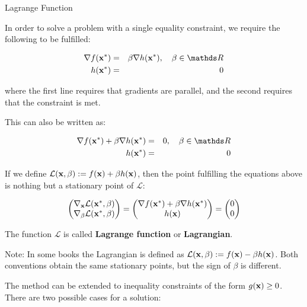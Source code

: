 \documentclass[11pt,compress,t,notes=noshow, xcolor=table]{beamer}
\begin{document}
\begin{vbframe}{Lagrange Function}

In order to solve a problem with a single equality constraint, we require the following to be fulfilled: 

\begin{eqnarray*}
\nabla f(\xv^\ast) &=& \beta \nabla h(\xv^\ast), \quad \beta \in \R\\
h(\xv^\ast) &=& 0
\end{eqnarray*}

where the first line requires that gradients are parallel, and the second requires that the constraint is met. 

\lz 

This can also be written as: 

\begin{eqnarray*}
\nabla f(\xv^\ast) + \beta \nabla h(\xv^\ast) &=& 0, \quad \beta \in \R\\
h(\xv^\ast) &=& 0
\end{eqnarray*}

\framebreak 

If we define $\mathcal{L}(\mathbf{x}, \beta) := f(\mathbf{x}) + \beta h(\mathbf{x})$, then the point fulfilling the equations above is nothing but a stationary point of $\mathcal{L}$: 

$$
  \begin{pmatrix}
  \nabla_{\mathbf{x}} \mathcal{L}(\mathbf{x}^\ast, \beta) \\
  \nabla_\beta \mathcal{L}(\mathbf{x}^\ast, \beta)
  \end{pmatrix} = \begin{pmatrix} \nabla f(\mathbf{x}^\ast) + \beta \nabla h(\mathbf{x}^\ast) \\
  h(\mathbf{x})
  \end{pmatrix} = \begin{pmatrix}
  0 \\ 0 \end{pmatrix}
$$

The function $\mathcal{L}$ is called \textbf{Lagrange function} or \textbf{Lagrangian}. 

\vspace*{0.2cm}

Note: In some books the Lagrangian is defined as $\mathcal{L}(\mathbf{x}, \beta) := f(\mathbf{x}) - \beta h(\mathbf{x})$. Both conventions obtain the same stationary points, but the sign of $\beta$ is different. 

\framebreak

The method can be extended to inequality constraints of the form $g(\mathbf{x}) \geq 0$. There are two possible cases for a solution: 


\end{vbframe}
\end{document}
